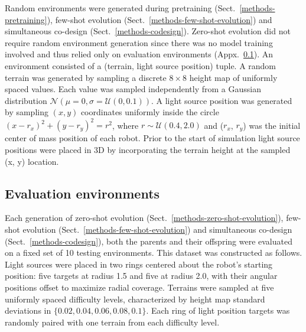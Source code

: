 Random environments were generated during pretraining (Sect.~\ref{methods-pretraining}), 
few-shot evolution (Sect.~\ref{methods-few-shot-evolution}) 
and 
simultaneous co-design (Sect.~\ref{methods-codesign}). Zero-shot evolution did not require random environment generation since there was no model training involved and thus relied only on evaluation environments (Appx.~\ref{appendix-dataset-evaluation-environments}).
An environment consisted of a (terrain, light source position) tuple. A random terrain was generated by sampling a discrete $8 \times 8$ height map of uniformly spaced values. Each value was sampled independently from a Gaussian distribution $\mathcal{N}(\mu = 0, \sigma = \mathcal{U}(0, 0.1))$. A light source position was generated by sampling $(x, y)$ coordinates uniformly inside the circle $(x - r_x)^2 + (y - r_y)^2 = r^2$, where $r \sim \mathcal{U}(0.4, 2.0)$ and ($r_x$, $r_y$) was the initial center of mass position of each robot. Prior to the start of simulation light source positions were placed in 3D by incorporating the terrain height at the sampled (x, y) location.

\subsection{Evaluation environments}
\label{appendix-dataset-evaluation-environments}

Each generation of zero-shot evolution (Sect.~\ref{methods-zero-shot-evolution}), 
few-shot evolution (Sect.~\ref{methods-few-shot-evolution}) 
and simultaneous co-design (Sect.~\ref{methods-codesign}),
both the parents and their offspring were evaluated on a fixed set of 10 testing environments. 
This dataset was constructed as follows. 
Light sources were placed in two rings centered about the robot's starting position: five targets at radius 1.5 and five at radius 2.0, with their angular positions offset to maximize radial coverage. 
Terrains were sampled at five uniformly spaced difficulty levels, characterized by height map standard deviations in $\{0.02, 0.04, 0.06, 0.08, 0.1\}$. 
Each ring of light position targets was randomly paired with one terrain from each difficulty level.

